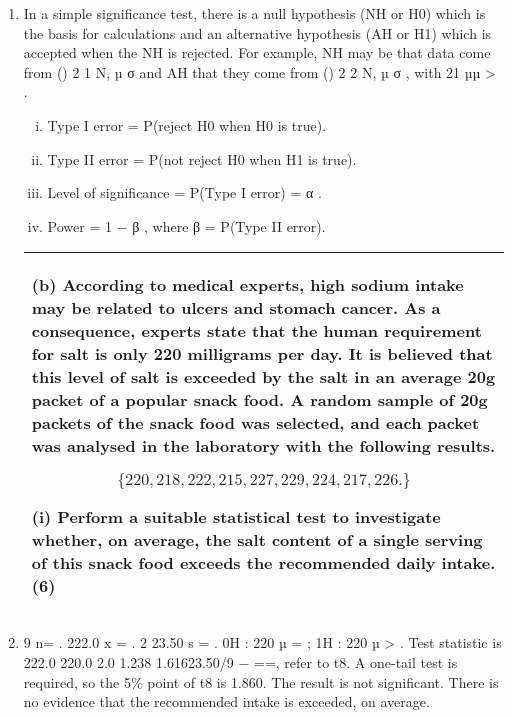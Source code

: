 \documentclass[a4paper,12pt]{article}
\begin{document}
\begin{enumerate} 
\item In a simple significance test, there is a null hypothesis (NH or H0) which is the basis for calculations and an alternative hypothesis (AH or H1) which is accepted when the NH is rejected.  For example, NH may be that data come from () 2 1 N, µ σ
 and AH that they come from () 2 2 N, µ σ , with 21 µµ > . 
 
\begin{enumerate}[(i)] 

\item  Type I error = P(reject H0 when H0 is true). 
\item Type II error = P(not reject H0 when H1 is true). 
\item Level of significance = P(Type I error) = α . 
\item  Power = 1 − β , where β = P(Type II error). 
\end{enumerate} 

\newpage
\begin{table}[ht!]
 
\centering
 
\begin{tabular}{|p{15cm}|}
 
\hline  
 
 
(b) According to medical experts, high sodium intake may be related to ulcers and stomach cancer.  
As a consequence, experts state that the human requirement for salt is only 220 milligrams per day.  
It is believed that this level of salt is exceeded by the salt in an average 20g packet of a popular snack food.  A random sample of 20g packets of the snack food was selected, and each packet was analysed in the laboratory with the following results. 
 
\[ \{220, 218, 222, 215, 227, 229, 224, 217, 226. \}\]
 
 
(i) Perform a suitable statistical test to investigate whether, on average, the salt content of a single serving of 
this snack food exceeds the recommended daily intake. (6) 
 

\\ \hline
  
\end{tabular}

\end{table} 
\item  9 n= .   222.0 x = .   2 23.50 s = .   0H : 220 µ = ;   1H : 220 µ > .  Test statistic is 222.0 220.0 2.0 1.238 1.61623.50/9 − ==, refer to t8. 
 A one-tail test is required, so the 5\% point of t8 is 1.860.  The result is not significant.  There is no evidence that the recommended intake is exceeded, on average. 
 

\end{enumerate}
\end{document}
